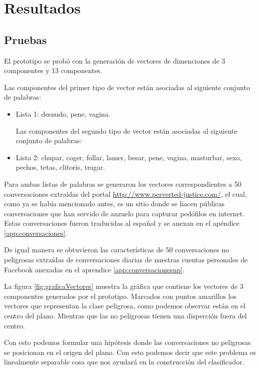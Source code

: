 \section{Resultados}
\subsection{Pruebas}
El prototipo se probó con la generaci\'on de vectores de dimenciones de 3 componentes y 13 componentes.

Las componentes del primer tipo de vector est\'an asociadas al siguiente conjunto de palabras:
\begin{itemize}
\item Lista 1: desnudo, pene, vagina. 

Las componentes del segundo tipo de vector est\'an asociadas al siguiente conjunto de palabras:

\item Lista 2: chupar, coger, follar, lamer, besar, pene, vagina, masturbar, sexo, pechos, tetas, clitoris, tragar.
\end{itemize}

Para ambas listas de palabras se generaron los vectores correspondientes a 50 conversaciones extra\'idas del portal \url{http://www.perverted-justice.com/}, el cual, como ya se hab\'ia mencionado antes, es un sitio donde se hacen p\'ublicas conversaciones que han servido de anzuelo para capturar ped\'ofilos en internet. Estas conversaciones fueron traducidas al español y se anexan en el ap\'endice \ref{app:conversaciones}.


De igual manera se obtuvieron las caracter\'isticas de 50 conversaciones no peligrosas extra\'idas de conversaciones diarias de nuestras cuentas personales de Facebook anexadas en el aprendice \ref{app:conversacionesnp}.

La figura \ref{fig:graficaVectores} muestra la gr\'afica que contiene los vectores de 3 componentes generados por el prototipo. Marcados con puntos amarillos los vectores que representan la clase peligrosa, como podemos observar est\'an en el centro del plano. Mientras que las no peligrosas tienen una disperci\'on fuera del centro. 

Con esto podemos formular una hip\'otesis donde las conversaciones no peligrosas se posicionan en el origen del plano. Con esto podemos decir que este problema es linealmente separable cosa que nos ayudar\'a en la construcci\'on del clasificador. 

